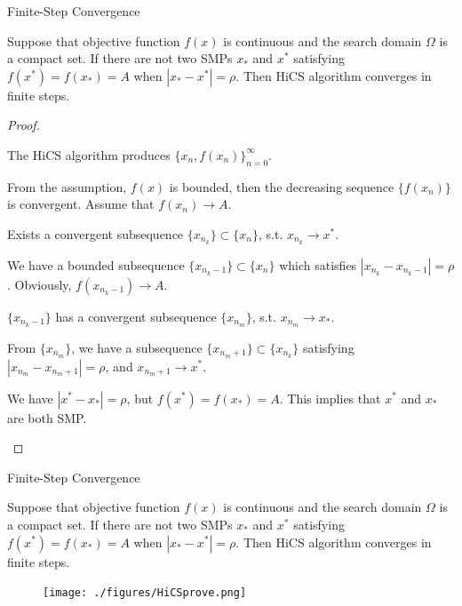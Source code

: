 \documentclass{beamer}
\begin{document}
\begin{frame}{Finite-Step Convergence}

\footnotesize{
\begin{theorem}
	Suppose that objective function $f(x)$ is continuous and the
	search domain $\Omega$ is a compact set.
	If there are not two SMPs $x_*$ and $x^*$ satisfying
	$f(x^*)=f(x_*)=A$ when $|x_*-x^*|=\rho$.
	Then HiCS algorithm converges in finite steps.
\end{theorem}
}
\pause
\vspace{-0.1cm}
\begin{proof}
\begin{itemize}
\footnotesize{
	\item The HiCS algorithm produces $\{x_n,
		f(x_n)\}_{n=0}^{\infty}$.
	\item From the assumption, $f(x)$ is bounded, then
		the decreasing sequence $\{f(x_n)\}$ is convergent.
		Assume that $f(x_n)\rightarrow A$.
	\item Exists a convergent subsequence $\{x_{n_k}\}\subset
		\{x_n\}$, s.t.  $x_{n_k}\rightarrow x^*$. 
	\item We have a bounded subsequence
		$\{x_{n_{k}-1}\}\subset \{x_n\}$ which satisfies
		$|x_{n_k}-x_{n_{k}-1}|=\rho$. Obviously,
		$f(x_{{n_k}-1})\rightarrow A$.
	\item $\{x_{n_{k}-1}\}$ has a
		convergent subsequence $\{x_{n_{m}}\}$, s.t.
		$x_{n_{m}}\rightarrow x_*$.
	\item From $\{x_{n_{m}}\}$, we have a subsequence
		$\{x_{n_{m}+1}\}\subset\{ x_{n_k}\}$ satisfying
		$|x_{n_m}-x_{n_{m}+1}|=\rho$, and $x_{{n_m}+1}\rightarrow x^*$.
	\item We have $|x^* - x_*|=\rho$, but $f(x^*)=f(x_*)=A$. This
		implies that $x^*$ and $x_*$ are both SMP.
		}
\end{itemize}
\end{proof}

\end{frame}

\begin{frame}{Finite-Step Convergence}

\footnotesize{
\begin{theorem}
	Suppose that objective function $f(x)$ is continuous and the
	search domain $\Omega$ is a compact set.
	If there are not two SMPs $x_*$ and $x^*$ satisfying
	$f(x^*)=f(x_*)=A$ when $|x_*-x^*|=\rho$.
	Then HiCS algorithm converges in finite steps.
\end{theorem}
}
\begin{figure}[!htbp]
	\centering
	  \texttt{[image: ./figures/HiCSprove.png]}
\end{figure}

\end{frame}
\end{document}
